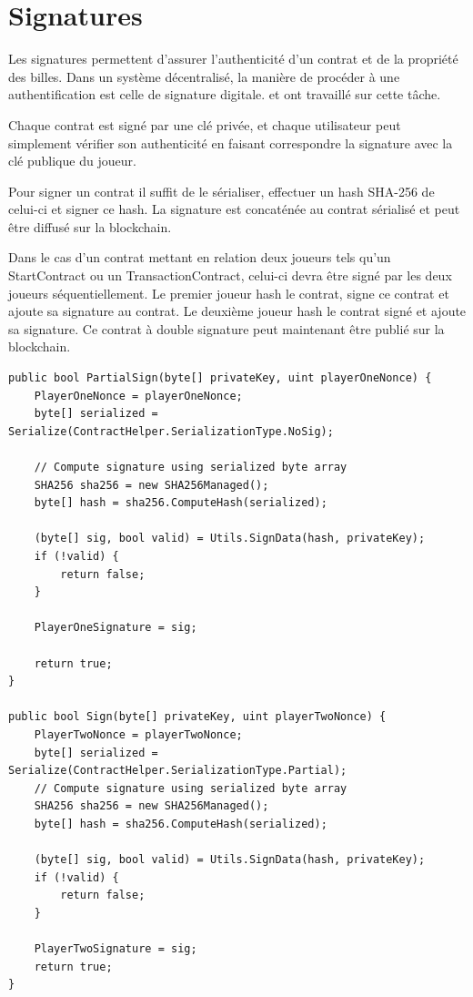 \documentclass{article}
\begin{document}
\section{Signatures}
Les signatures permettent d'assurer l'authenticité d'un contrat et de la propriété des billes. Dans un système décentralisé, la manière de procéder à une authentification est celle de signature digitale.  et  ont travaillé sur cette tâche.

Chaque contrat est signé par une clé privée, et chaque utilisateur peut simplement vérifier son authenticité en faisant correspondre la signature avec la clé publique du joueur.

Pour signer un contrat il suffit de le sérialiser, effectuer un hash SHA-256 de celui-ci et signer ce hash. La signature est concaténée au contrat sérialisé et peut être diffusé sur la blockchain.

Dans le cas d'un contrat mettant en relation deux joueurs tels qu'un StartContract ou un TransactionContract, celui-ci devra être signé par les deux joueurs séquentiellement. Le premier joueur hash le contrat, signe ce contrat et ajoute sa signature au contrat. Le deuxième joueur hash le contrat signé et ajoute sa signature. Ce contrat à double signature peut maintenant être publié sur la blockchain.

\filbreak
\begin{verbatim}
public bool PartialSign(byte[] privateKey, uint playerOneNonce) {
    PlayerOneNonce = playerOneNonce;
    byte[] serialized = Serialize(ContractHelper.SerializationType.NoSig);
    
    // Compute signature using serialized byte array
    SHA256 sha256 = new SHA256Managed();
    byte[] hash = sha256.ComputeHash(serialized);

    (byte[] sig, bool valid) = Utils.SignData(hash, privateKey);
    if (!valid) {
        return false;
    }

    PlayerOneSignature = sig;

    return true;
}

public bool Sign(byte[] privateKey, uint playerTwoNonce) {
    PlayerTwoNonce = playerTwoNonce;
    byte[] serialized = Serialize(ContractHelper.SerializationType.Partial);
    // Compute signature using serialized byte array
    SHA256 sha256 = new SHA256Managed();
    byte[] hash = sha256.ComputeHash(serialized);

    (byte[] sig, bool valid) = Utils.SignData(hash, privateKey);
    if (!valid) {
        return false;
    }

    PlayerTwoSignature = sig;
    return true;
}
\end{verbatim}
\end{document}

